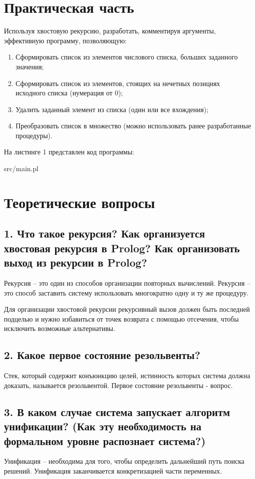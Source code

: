 \chapter*{Практическая часть}
Используя хвостовую рекурсию, разработать, комментируя аргументы,
эффективную программу, позволяющую:
\begin{enumerate}
	\item Сформировать список из элементов числового списка, больших заданного значения;
	\item Сформировать список из элементов, стоящих на нечетных позициях исходного списка (нумерация от 0);
	\item Удалить заданный элемент из списка (один или все вхождения);
	\item Преобразовать список в множество (можно использовать ранее разработанные
	процедуры).
\end{enumerate}
На листинге 1 представлен код программы:

\FloatBarrier
\begin{lstinputlisting}[style={lsp}]{src/main.pl}
\end{lstinputlisting}
\FloatBarrier

\chapter*{Теоретические вопросы}

\section*{1. Что такое рекурсия? Как организуется хвостовая рекурсия в Prolog? Как организовать выход из рекурсии в Prolog?}
Рекурсия – это один из способов организации повторных вычислений. Рекурсия – это способ заставить систему использовать многократно одну и ту же процедуру.

Для организации хвостовой рекурсии рекурсивный вызов должен быть последней подцелью и нужно избавиться от точек возврата с помощью отсечения, чтобы исключить возможные альтернативы.

\section*{2. Какое первое состояние резольвенты?}
Стек, который содержит конъюнкцию целей, истинность которых система должна доказать, называется
резольвентой. Первое состояние резольвенты - вопрос.

\section*{3. В каком случае система запускает алгоритм унификации? (Как эту необходимость на формальном уровне распознает система?)}
Унификация – необходима для того, чтобы определить дальнейший путь поиска решений. Унификация заканчивается конкретизацией части переменных.

